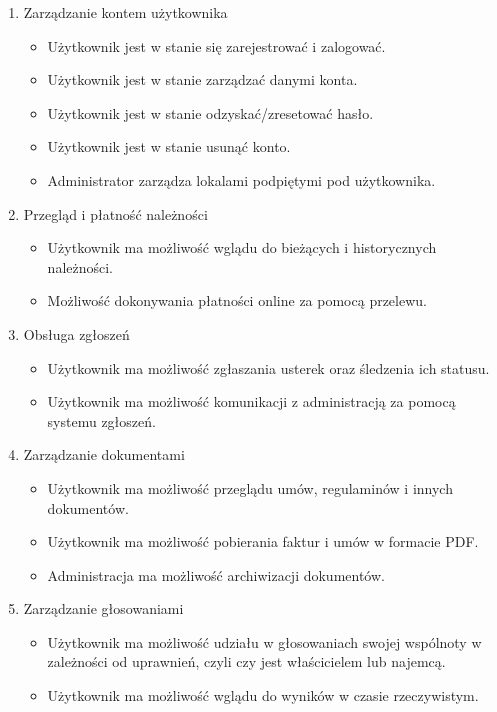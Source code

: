 \begin{enumerate}[label=\arabic*.]
    \item Zarządzanie kontem użytkownika
    \begin{itemize}
        \item Użytkownik jest w stanie się zarejestrować i zalogować.
        \item Użytkownik jest w stanie zarządzać danymi konta.
        \item Użytkownik jest w stanie odzyskać/zresetować hasło.
        \item Użytkownik jest w stanie usunąć konto.
        \item Administrator zarządza lokalami podpiętymi pod użytkownika.
    \end{itemize}
    \item Przegląd i płatność należności
    \begin{itemize}
        \item Użytkownik ma możliwość wglądu do bieżących i historycznych należności.
        \item Możliwość dokonywania płatności online za pomocą przelewu.
    \end{itemize}
    \item Obsługa zgłoszeń
    \begin{itemize}
        \item Użytkownik ma możliwość zgłaszania usterek oraz śledzenia ich statusu.
        \item Użytkownik ma możliwość komunikacji z administracją za pomocą systemu zgłoszeń.
    \end{itemize}
    \item Zarządzanie dokumentami
    \begin{itemize}
        \item Użytkownik ma możliwość przeglądu umów, regulaminów i innych dokumentów.
        \item Użytkownik ma możliwość pobierania faktur i umów w formacie PDF.
        \item Administracja ma możliwość archiwizacji dokumentów.
    \end{itemize}
    \item Zarządzanie głosowaniami
    \begin{itemize}
        \item Użytkownik ma możliwość udziału w głosowaniach swojej wspólnoty w zależności od uprawnień, czyli czy jest właścicielem lub najemcą.
        \item Użytkownik ma możliwość wglądu do wyników w czasie rzeczywistym.

\end{itemize}
\end{enumerate}
